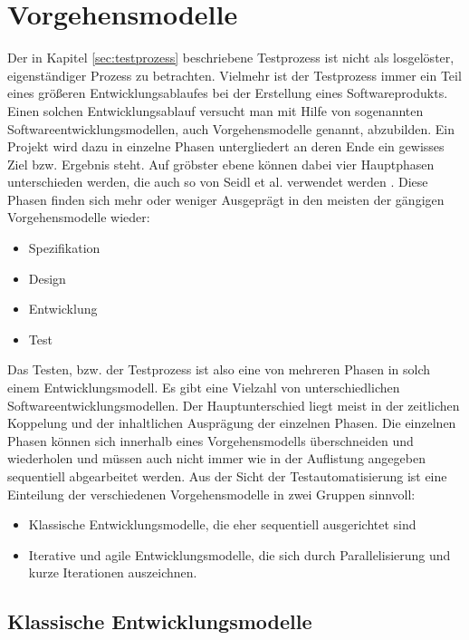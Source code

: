 \section{Vorgehensmodelle}
\label{sec:vorgehensmodelle}
Der in Kapitel \ref{sec:testprozess} beschriebene Testprozess ist nicht als losgelöster, eigenständiger Prozess zu betrachten. Vielmehr ist der Testprozess immer ein Teil eines größeren Entwicklungsablaufes bei der Erstellung eines Softwareprodukts. Einen solchen Entwicklungsablauf versucht man mit Hilfe von sogenannten Softwareentwicklungsmodellen, auch Vorgehensmodelle genannt, abzubilden.
Ein Projekt wird dazu in einzelne Phasen untergliedert an deren Ende ein gewisses Ziel bzw. Ergebnis steht.
Auf gröbster ebene können dabei vier Hauptphasen unterschieden werden, die auch so von Seidl et al. verwendet werden \cite[S.21 ff.]{seidl_basiswissen_2012}. Diese Phasen finden sich mehr oder weniger Ausgeprägt in den meisten der gängigen Vorgehensmodelle wieder:

\begin{itemize}
\item Spezifikation
\item Design
\item Entwicklung
\item Test
\end{itemize}

Das Testen, bzw. der Testprozess ist also eine von mehreren Phasen in solch einem Entwicklungsmodell.
Es gibt eine Vielzahl von unterschiedlichen Softwareentwicklungsmodellen. Der Hauptunterschied liegt meist in der zeitlichen Koppelung und der inhaltlichen Ausprägung der einzelnen Phasen. Die einzelnen Phasen können sich innerhalb eines Vorgehensmodells überschneiden und wiederholen und müssen auch nicht immer wie in der Auflistung angegeben sequentiell abgearbeitet werden.
Aus der Sicht der Testautomatisierung ist eine Einteilung der verschiedenen Vorgehensmodelle in zwei Gruppen sinnvoll: \cite[vgl. S.21 ff.]{seidl_basiswissen_2012}

\begin{itemize}
\item Klassische Entwicklungsmodelle, die eher sequentiell ausgerichtet sind
\item Iterative und agile Entwicklungsmodelle, die sich durch Parallelisierung und kurze Iterationen auszeichnen.
\end{itemize}

\subsection{Klassische Entwicklungsmodelle}
\label{subsec:klassische_entwicklungsmodelle}


